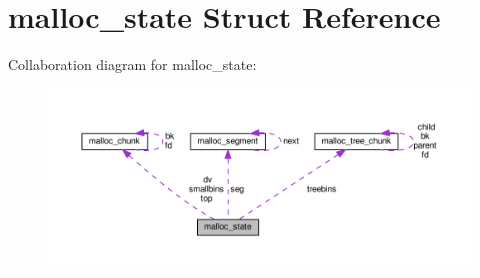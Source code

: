 \hypertarget{structmalloc__state}{}\section{malloc\+\_\+state Struct Reference}
\label{structmalloc__state}


Collaboration diagram for malloc\+\_\+state\+:\nopagebreak
\begin{figure}[H]
\begin{center}
\leavevmode
\includegraphics[width=350pt]{structmalloc__state__coll__graph}
\end{center}
\end{figure}
